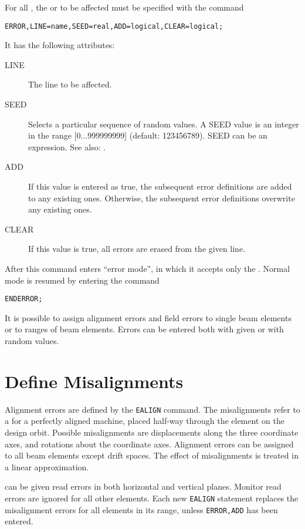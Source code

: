 For all ,
the  or  to be
affected must be specified with the command
\begin{verbatim}
ERROR,LINE=name,SEED=real,ADD=logical,CLEAR=logical;
\end{verbatim}
It has the following attributes:
\begin{description}
\item[LINE]
  The line to be affected.
\item[SEED]
  Selects a particular sequence of random values.
  A SEED value is an integer in the range [0...999999999] (default: 123456789).
  SEED can be an expression.
  See also: .
\item[ADD]
  If this value is entered as true, the subsequent error definitions
  are added to any existing ones.
  Otherwise, the subsequent error definitions overwrite any existing
  ones.
\item[CLEAR]
  If this value is true, all errors are erased from the given line.
\end{description}
After this command \opal enters ``error mode'', in which it accepts only
the .
Normal mode is resumed by entering the command
\begin{verbatim}
ENDERROR;
\end{verbatim}
It is possible to assign alignment errors and field errors
to single beam elements or to ranges of beam elements.
Errors can be entered both with given or with random values.

\section{Define Misalignments}
\label{sec:erroralign}
Alignment errors are defined by the \texttt{EALIGN} command.
The misalignments refer to a 
for a perfectly aligned machine, placed half-way through the element
on the design orbit.
Possible misalignments are displacements along the three coordinate axes,
and rotations about the coordinate axes.
Alignment errors can be assigned to all beam elements except drift spaces.
The effect of misalignments is treated in a linear approximation.

can be given read errors in both horizontal and vertical planes.
Monitor read errors are ignored for all other elements.
Each new \texttt{EALIGN} statement replaces the misalignment errors
for all elements in its range, unless \texttt{ERROR,ADD}
has been entered.

